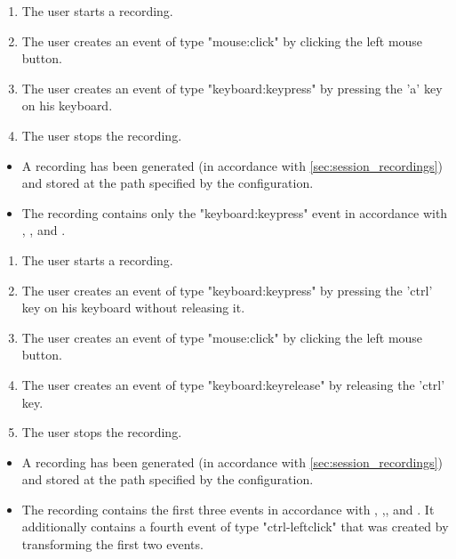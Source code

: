\begin{tests}
    {\begin{enumerate}
        \item The \gls{user} starts a recording.
        \item The \gls{user} creates an \gls{event} of type "mouse:click" by clicking the left mouse button.
        \item The \gls{user} creates an \gls{event} of type "keyboard:keypress" by pressing the 'a' key on his keyboard.
        \item The \gls{user} stops the recording.
    \end{enumerate}}
    {\begin{itemize}
        \item A recording has been generated (in accordance with \ref{sec:session_recordings}) and stored at the path specified by the configuration.
        \item The recording contains only the "keyboard:keypress" event in accordance with , ,  and .
    \end{itemize}}

    {\begin{enumerate}
        \item The \gls{user} starts a recording.
        \item The \gls{user} creates an \gls{event} of type "keyboard:keypress" by pressing the 'ctrl' key on his keyboard without releasing it.
        \item The \gls{user} creates an \gls{event} of type "mouse:click" by clicking the left mouse button.
        \item The \gls{user} creates an \gls{event} of type "keyboard:keyrelease" by releasing the 'ctrl' key.
        \item The \gls{user} stops the recording.
    \end{enumerate}}
    {\begin{itemize}
        \item A recording has been generated (in accordance with \ref{sec:session_recordings}) and stored at the path specified by the configuration.
        \item The recording contains the first three events in accordance with , ,, and . It additionally contains a fourth event of type "ctrl-leftclick" that was created by transforming the first two \glspl{event}.
    \end{itemize}}


\end{tests}
